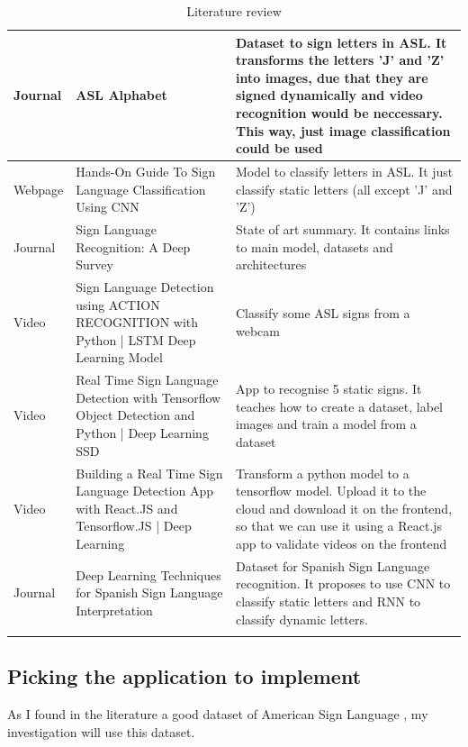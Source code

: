 \begin{longtable}{|p{3cm}|p{4cm}|p{6cm}|}
    \hline Journal & ASL Alphabet \cite{Akash2018} & Dataset to sign letters in ASL. It transforms the letters 'J' and 'Z' into images, due that they are signed dynamically and video recognition would be neccessary. This way, just image classification could be used \\
    \hline Webpage & Hands-On Guide To Sign Language Classification Using CNN \cite{SignLanguageClassification2020} & Model to classify letters in ASL. It just classify static letters (all except 'J' and 'Z') \\
    \hline Journal & Sign Language Recognition: A Deep Survey \cite{Rastgoo2021} & State of art summary. It contains links to main model, datasets and architectures \\
    \hline Video   & Sign Language Detection using ACTION RECOGNITION with Python | LSTM Deep Learning Model \cite{SignLanguageRecognitionUsingActionRecognition} & Classify some ASL signs from a webcam \\
    \hline Video   & Real Time Sign Language Detection with Tensorflow Object Detection and Python | Deep Learning SSD \cite{SignLanguageRecognitionUsingObjectDetection} & App to recognise 5 static signs. It teaches how to create a dataset, label images and train a model from a dataset \\
    \hline Video   & Building a Real Time Sign Language Detection App with React.JS and Tensorflow.JS | Deep Learning \cite{SignLanguageRecognitionUsingReactjsAndTensorflow} & Transform a python model to a tensorflow model. Upload it to the cloud and download it on the frontend, so that we can use it using a React.js app to validate videos on the frontend \\
    \hline Journal & Deep Learning Techniques for Spanish Sign Language Interpretation \cite{SpanishDataset2021} & Dataset for Spanish Sign Language recognition. It proposes to use CNN to classify static letters and RNN to classify dynamic letters. \\
    \hline
    \caption{Literature review}
    \label{table:introduction_literature_review}
\end{longtable}

\subsection{Picking the application to implement}
As I found in the literature a good dataset of American Sign Language \cite{Li2019}, my investigation will use this dataset. \\

